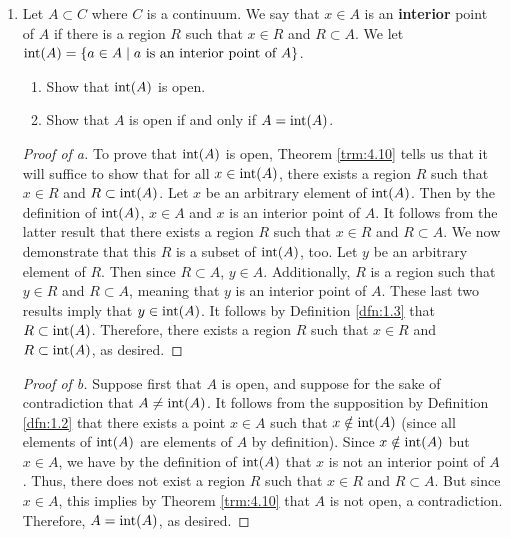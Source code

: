\documentclass[../main.tex]{subfiles}
\begin{document}
\begin{enumerate}
\begin{proof}[Proof of a]
    \end{proof}
    \begin{proof}[Proof of b]
        To prove that $\overline{A}\subset\overline{B}$, Definition \ref{dfn:1.3} tells us that it will suffice to show that every element $x\in\overline{A}$ is an element of $\overline{B}$. Let $x$ be an arbitrary element of $\overline{A}$. Then by Definitions \ref{dfn:4.4} and \ref{dfn:1.5}, $x\in A$ or $x\in LP(A)$. We now divide into two cases. Suppose first that $x\in A$. Then since $A\subset B$, we have by Definition \ref{dfn:1.3} that $x\in B$. Consequently, by Definitions \ref{dfn:1.5} and \ref{dfn:4.4}, $x\in\overline{B}$. On the other hand, suppose that $x\in LP(A)$. Then since $A\subset B$, by Theorem \ref{trm:3.14}, $x\in LP(B)$. Consequently, by Definitions \ref{dfn:1.5} and \ref{dfn:4.4}, $x\in\overline{B}$.
    \end{proof}
    \item Let $A\subset C$ where $C$ is a continuum. We say that $x\in A$ is an \textbf{interior} point of $A$ if there is a region $R$ such that $x\in R$ and $R\subset A$. We let $\operatorname{int}(A)=\{a\in A\mid a\text{ is an interior point of }A\}$.
    \begin{enumerate}
        \item Show that $\operatorname{int}(A)$ is open.
        \item Show that $A$ is open if and only if $A=\operatorname{int}(A)$.
    \end{enumerate}
    \begin{proof}[Proof of a]
        To prove that $\operatorname{int}(A)$ is open, Theorem \ref{trm:4.10} tells us that it will suffice to show that for all $x\in\operatorname{int}(A)$, there exists a region $R$ such that $x\in R$ and $R\subset\operatorname{int}(A)$. Let $x$ be an arbitrary element of $\operatorname{int}(A)$. Then by the definition of $\operatorname{int}(A)$, $x\in A$ and $x$ is an interior point of $A$. It follows from the latter result that there exists a region $R$ such that $x\in R$ and $R\subset A$. We now demonstrate that this $R$ is a subset of $\operatorname{int}(A)$, too. Let $y$ be an arbitrary element of $R$. Then since $R\subset A$, $y\in A$. Additionally, $R$ is a region such that $y\in R$ and $R\subset A$, meaning that $y$ is an interior point of $A$. These last two results imply that $y\in\operatorname{int}(A)$. It follows by Definition \ref{dfn:1.3} that $R\subset\operatorname{int}(A)$. Therefore, there exists a region $R$ such that $x\in R$ and $R\subset\operatorname{int}(A)$, as desired.
    \end{proof}
    \begin{proof}[Proof of b]
        Suppose first that $A$ is open, and suppose for the sake of contradiction that $A\neq\operatorname{int}(A)$. It follows from the supposition by Definition \ref{dfn:1.2} that there exists a point $x\in A$ such that $x\notin\operatorname{int}(A)$ (since all elements of $\operatorname{int}(A)$ are elements of $A$ by definition). Since $x\notin\operatorname{int}(A)$ but $x\in A$, we have by the definition of $\operatorname{int}(A)$ that $x$ is not an interior point of $A$. Thus, there does not exist a region $R$ such that $x\in R$ and $R\subset A$. But since $x\in A$, this implies by Theorem \ref{trm:4.10} that $A$ is not open, a contradiction. Therefore, $A=\operatorname{int}(A)$, as desired.\par

\end{proof}
\end{enumerate}
\end{document}
